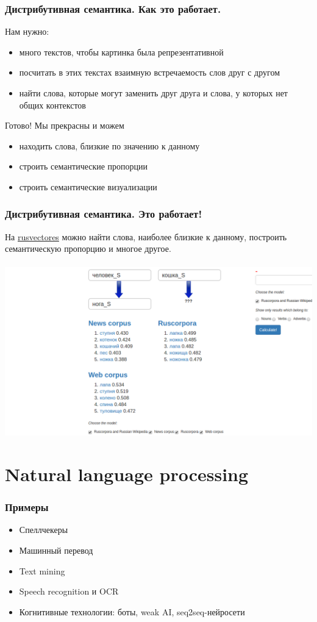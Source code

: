 \documentclass[10pt, compress]{beamer}
\begin{document}
\begin{frame}
 \frametitle{Дистрибутивная семантика. Как это работает.}
 Нам нужно:
 \begin{itemize}
 \item много текстов, чтобы картинка была репрезентативной
 \item посчитать в этих текстах взаимную встречаемость слов друг с другом
 \item найти слова, которые могут заменить друг друга и слова, у которых нет общих контекстов
 \end{itemize}
 Готово! Мы прекрасны и можем
 \begin{itemize}
 \item находить слова, близкие по значению к данному
 \item строить семантические пропорции
 \item строить семантические визуализации
 \end{itemize}
\end{frame}

\begin{frame}
 \frametitle{Дистрибутивная семантика. Это работает!}
 На \href{http://ling.go.mail.ru/dsm/en/}{rusvectores} можно найти слова, наиболее близкие к данному, построить семантическую пропорцию и многое другое.\\\\
 \includegraphics[width=\textwidth]{images/rusvectores.png}
\end{frame}
  
\section{Natural language processing}
\begin{frame}
  \frametitle{Примеры}
  \begin{itemize}
  \item Спеллчекеры
  \item Машинный перевод
  \item Text mining
  \item Speech recognition и OCR
  \item Когнитивные технологии: боты, weak AI, seq2seq-нейросети	
  \end{itemize}
\end{frame}
\end{document}
